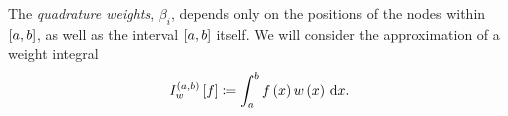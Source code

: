 \begin{frame}
    The \emph{quadrature weights}, $\beta_{i}$, depends only on the
    positions of the nodes within $\left[a,b\right]$, as well as the
    interval $\left[a,b\right]$ itself.
    We will consider the approximation of a weight integral
    \begin{equation*}
        I^{\left(a,b\right)}_{w}
        \left[f\right]\coloneqq
        \int_{a}^{b}
        f\left(x\right)
        w\left(x\right)
        \dl x.
    \end{equation*}


\end{frame}
